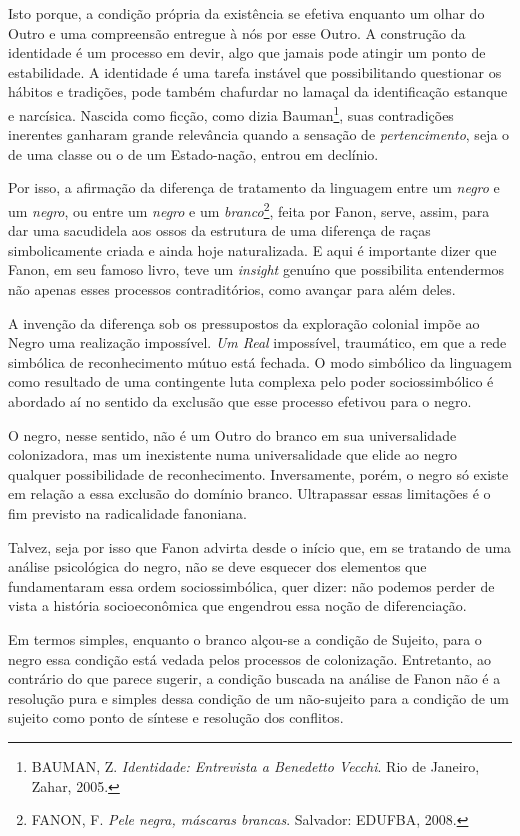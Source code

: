 Isto porque, a condição própria da existência se efetiva enquanto um
olhar do Outro e uma compreensão entregue à nós por esse Outro. A
construção da identidade é um processo em devir, algo que jamais pode
atingir um ponto de estabilidade. A identidade é uma tarefa instável que
possibilitando questionar os hábitos e tradições, pode também chafurdar
no lamaçal da identificação estanque e narcísica. Nascida como ficção,
como dizia Bauman\footnote{BAUMAN, Z. \emph{Identidade: Entrevista a
  Benedetto Vecchi}. Rio de Janeiro, Zahar, 2005.}, suas contradições
inerentes ganharam grande relevância quando a sensação de
\emph{pertencimento}, seja o de uma classe ou o de um Estado-nação,
entrou em declínio.

Por isso, a afirmação da diferença de tratamento da linguagem entre um
\emph{negro} e um \emph{negro}, ou entre um \emph{negro} e um
\emph{branco}\footnote{FANON, F. \emph{Pele negra, máscaras brancas}.
  Salvador: EDUFBA, 2008.}, feita por Fanon, serve, assim, para dar uma
sacudidela aos ossos da estrutura de uma diferença de raças
simbolicamente criada e ainda hoje naturalizada. E aqui é importante
dizer que Fanon, em seu famoso livro, teve um \emph{insight} genuíno que
possibilita entendermos não apenas esses processos contraditórios, como
avançar para além deles.

A invenção da diferença sob os pressupostos da exploração colonial impõe
ao Negro uma realização impossível. \emph{Um Real} impossível,
traumático, em que a rede simbólica de reconhecimento mútuo está
fechada. O modo simbólico da linguagem como resultado de uma contingente
luta complexa pelo poder sociossimbólico é abordado aí no sentido da
exclusão que esse processo efetivou para o negro.

O negro, nesse sentido, não é um Outro do branco em sua universalidade
colonizadora, mas um inexistente numa universalidade que elide ao negro
qualquer possibilidade de reconhecimento. Inversamente, porém, o negro
só existe em relação a essa exclusão do domínio branco. Ultrapassar
essas limitações é o fim previsto na radicalidade fanoniana.

Talvez, seja por isso que Fanon advirta desde o início que, em se
tratando de uma análise psicológica do negro, não se deve esquecer dos
elementos que fundamentaram essa ordem sociossimbólica, quer dizer: não
podemos perder de vista a história socioeconômica que engendrou essa
noção de diferenciação.

Em termos simples, enquanto o branco alçou-se a condição de Sujeito,
para o negro essa condição está vedada pelos processos de colonização.
Entretanto, ao contrário do que parece sugerir, a condição buscada na
análise de Fanon não é a resolução pura e simples dessa condição de um
não-sujeito para a condição de um sujeito como ponto de síntese e
resolução dos conflitos.

